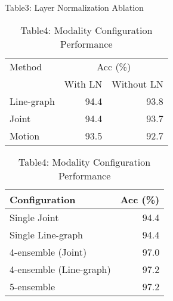 \begin{table}[htbp]
    \centering
    \begin{minipage}[t]{0.48\textwidth}
    \centering
    \caption{Table3: Layer Normalization Ablation}
    \label{tab:layer-norm}
    \begin{tabular}{@{}lrr@{}}
    \toprule
    Method & \multicolumn{2}{c}{Acc (\%)} \\
    \cmidrule(r){2-3}
     & With LN & Without LN \\
    \midrule
    Line-graph & 94.4 & 93.8 \\
    Joint & 94.4 & 93.7 \\
    Motion & 93.5 & 92.7 \\
    \bottomrule
    \end{tabular}
    \end{minipage}
    \hfill
    \begin{minipage}[t]{0.48\textwidth}
    \centering
    \caption{Table4: Modality Configuration Performance} 
    \label{tab:modality-perf}
    \begin{tabular}{@{}lr@{}}
    \toprule
    Configuration & Acc (\%) \\
    \midrule
    Single Joint & 94.4 \\
    Single Line-graph & 94.4 \\
    4-ensemble (Joint) & 97.0 \\
    4-ensemble (Line-graph) & 97.2 \\
    5-ensemble & 97.2 \\
    \bottomrule
    \end{tabular}
    \end{minipage}
    \end{table}